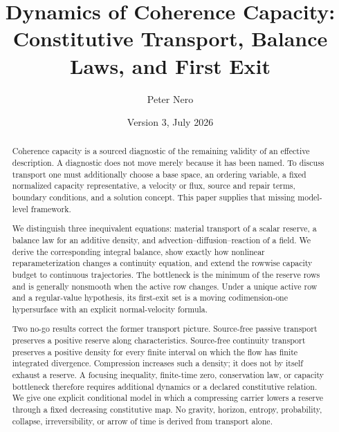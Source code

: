 \documentclass[11pt]{article}
\title{\vspace{-1em}
Dynamics of Coherence Capacity:\\
\large Constitutive Transport, Balance Laws, and First Exit}
\author{Peter Nero}
\date{Version 3, July 2026}
\theoremstyle{definition}
\theoremstyle{remark}
\begin{document}
\maketitle

\begin{abstract}
Coherence capacity is a sourced diagnostic of the remaining validity of an
effective description.  A diagnostic does not move merely because it has
been named.  To discuss transport one must additionally choose a base
space, an ordering variable, a fixed normalized capacity representative,
a velocity or flux, source and repair terms, boundary conditions, and a
solution concept.  This paper supplies that missing model-level framework.

We distinguish three inequivalent equations: material transport of a
scalar reserve, a balance law for an additive density, and
advection--diffusion--reaction of a field.  We derive the corresponding
integral balance, show exactly how nonlinear reparameterization changes a
continuity equation, and extend the rowwise capacity budget to continuous
trajectories.  The bottleneck is the minimum of the reserve rows and is
generally nonsmooth when the active row changes.  Under a unique active row
and a regular-value hypothesis, its first-exit set is a moving
codimension-one hypersurface with an explicit normal-velocity formula.

Two no-go results correct the former transport picture.  Source-free
passive transport preserves a positive reserve along characteristics.
Source-free continuity transport preserves a positive density for every
finite interval on which the flow has finite integrated divergence.
Compression increases such a density; it does not by itself exhaust a
reserve.  A focusing inequality, finite-time zero, conservation law, or
capacity bottleneck therefore requires additional dynamics or a declared
constitutive relation.  We give one explicit conditional model in which a
compressing carrier lowers a reserve through a fixed decreasing
constitutive map.  No gravity, horizon, entropy, probability, collapse,
irreversibility, or arrow of time is derived from transport alone.
\end{abstract}
\end{document}
